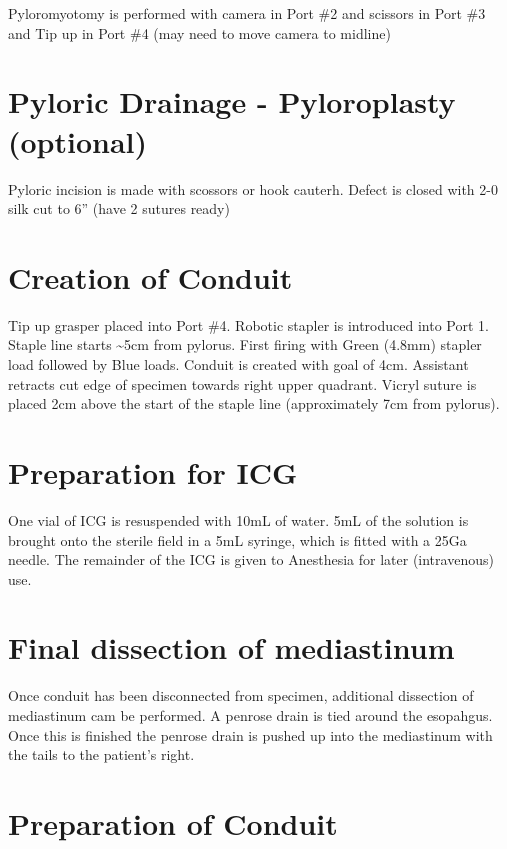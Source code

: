 \documentclass[
  letterpaper,
]{scrbook}
\begin{document}
Pyloromyotomy is performed with camera in Port \#2 and scissors in Port
\#3 and Tip up in Port \#4 (may need to move camera to midline)

\section{Pyloric Drainage - Pyloroplasty
(optional)}\label{pyloric-drainage---pyloroplasty-optional-1}

Pyloric incision is made with scossors or hook cauterh. Defect is closed
with 2-0 silk cut to 6'' (have 2 sutures ready)

\section{Creation of Conduit}\label{creation-of-conduit-1}

Tip up grasper placed into Port \#4. Robotic stapler is introduced into
Port 1. Staple line starts \textasciitilde5cm from pylorus. First firing
with Green (4.8mm) stapler load followed by Blue loads. Conduit is
created with goal of 4cm. Assistant retracts cut edge of specimen
towards right upper quadrant. Vicryl suture is placed 2cm above the
start of the staple line (approximately 7cm from pylorus).

\section{Preparation for ICG}\label{preparation-for-icg-1}

One vial of ICG is resuspended with 10mL of water. 5mL of the solution
is brought onto the sterile field in a 5mL syringe, which is fitted with
a 25Ga needle. The remainder of the ICG is given to Anesthesia for later
(intravenous) use.

\section{Final dissection of
mediastinum}\label{final-dissection-of-mediastinum}

Once conduit has been disconnected from specimen, additional dissection
of mediastinum cam be performed. A penrose drain is tied around the
esopahgus. Once this is finished the penrose drain is pushed up into the
mediastinum with the tails to the patient's right.

\section{Preparation of Conduit}\label{preparation-of-conduit-2}
\end{document}

